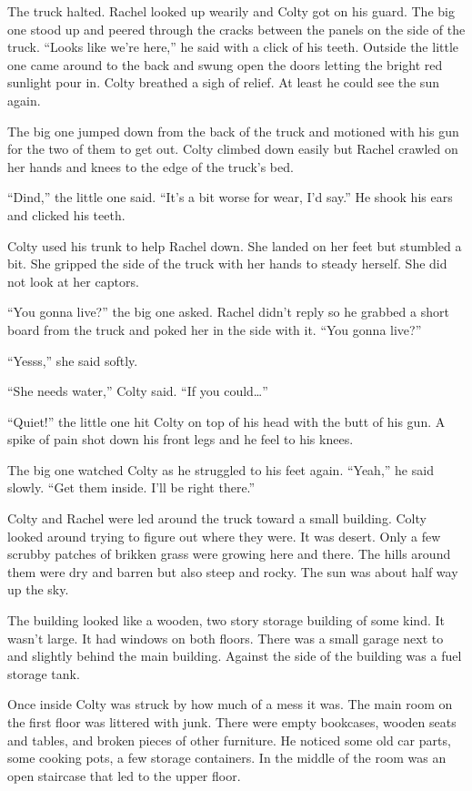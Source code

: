 
The truck halted. Rachel looked up wearily and Colty got on his guard. The big one stood up and
peered through the cracks between the panels on the side of the truck. ``Looks like we're
here,'' he said with a click of his teeth. Outside the little one came around to the back and
swung open the doors letting the bright red sunlight pour in. Colty breathed a sigh of relief.
At least he could see the sun again.

The big one jumped down from the back of the truck and motioned with his gun for the two of them
to get out. Colty climbed down easily but Rachel crawled on her hands and knees to the edge of
the truck's bed.

``Dind,'' the little one said. ``It's a bit worse for wear, I'd say.'' He shook his ears and
clicked his teeth.

Colty used his trunk to help Rachel down. She landed on her feet but stumbled a bit. She gripped
the side of the truck with her hands to steady herself. She did not look at her captors.

``You gonna live?'' the big one asked. Rachel didn't reply so he grabbed a short board from the
truck and poked her in the side with it. ``You gonna live?''

``Yesss,'' she said softly.

``She needs water,'' Colty said. ``If you could\ldots''

``Quiet!'' the little one hit Colty on top of his head with the butt of his gun. A spike of pain
shot down his front legs and he feel to his knees.

The big one watched Colty as he struggled to his feet again. ``Yeah,'' he said slowly. ``Get
them inside. I'll be right there.''

Colty and Rachel were led around the truck toward a small building. Colty looked around trying
to figure out where they were. It was desert. Only a few scrubby patches of brikken grass were
growing here and there. The hills around them were dry and barren but also steep and rocky. The
sun was about half way up the sky.

The building looked like a wooden, two story storage building of some kind. It wasn't large. It
had windows on both floors. There was a small garage next to and slightly behind the main
building. Against the side of the building was a fuel storage tank.

Once inside Colty was struck by how much of a mess it was. The main room on the first floor was
littered with junk. There were empty bookcases, wooden seats and tables, and broken pieces of
other furniture. He noticed some old car parts, some cooking pots, a few storage containers. In
the middle of the room was an open staircase that led to the upper floor.

